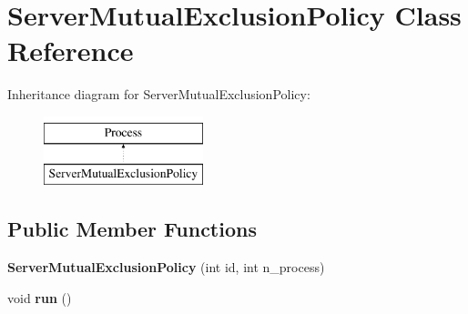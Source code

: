\hypertarget{classdistributed__system_1_1ServerMutualExclusionPolicy}{}\section{Server\+Mutual\+Exclusion\+Policy Class Reference}
\label{classdistributed__system_1_1ServerMutualExclusionPolicy}
Inheritance diagram for Server\+Mutual\+Exclusion\+Policy\+:\begin{figure}[H]
\begin{center}
\leavevmode
\includegraphics[height=2.000000cm]{classdistributed__system_1_1ServerMutualExclusionPolicy}
\end{center}
\end{figure}
\subsection*{Public Member Functions}
\begin{DoxyCompactItemize}
\item 
{\bfseries Server\+Mutual\+Exclusion\+Policy} (int id, int n\+\_\+process)\hypertarget{classdistributed__system_1_1ServerMutualExclusionPolicy_ac92be0175c62808b6cc40992a7a18b45}{}\label{classdistributed__system_1_1ServerMutualExclusionPolicy_ac92be0175c62808b6cc40992a7a18b45}

\item 
void {\bfseries run} ()\hypertarget{classdistributed__system_1_1ServerMutualExclusionPolicy_a13a43e6d814de94978c515cb084873b1}{}\label{classdistributed__system_1_1ServerMutualExclusionPolicy_a13a43e6d814de94978c515cb084873b1}

\end{DoxyCompactItemize}
